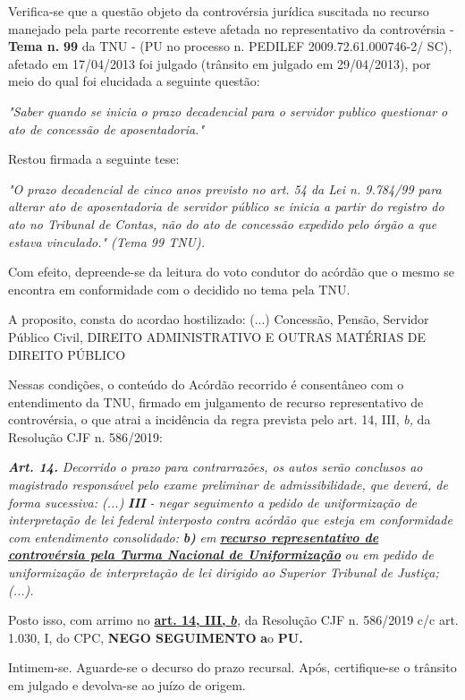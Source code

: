\documentclass[12pt]{article}
\begin{document}
\justifying
\noindent Verifica-se que a questão objeto da controvérsia jurídica suscitada no recurso manejado pela parte recorrente esteve afetada no representativo da controvérsia - \textbf{Tema n. }\textbf{99} da TNU - (PU no processo n. PEDILEF 2009.72.61.000746-2/ SC),  afetado em 17/04/2013 foi julgado (trânsito em julgado em 29/04/2013), por meio do qual foi elucidada a seguinte questão:

\noindent \textit{"Saber quando se inicia o prazo decadencial para o servidor publico questionar o ato de concessão de aposentadoria."}

\noindent Restou firmada a seguinte tese:

\noindent \textit{"O prazo decadencial de cinco anos previsto no art. 54 da Lei n. 9.784/99 para alterar ato de aposentadoria de servidor público se inicia a partir do registro do ato no Tribunal de Contas, não do ato de concessão expedido pelo órgão a que estava vinculado." (Tema 99 TNU).}

\noindent Com efeito, depreende-se da leitura do voto condutor do acórdão que o mesmo se encontra em conformidade com o decidido no  tema pela TNU.

\noindent A proposito, consta do acordao hostilizado: (...) Concessão, Pensão, Servidor Público Civil, DIREITO ADMINISTRATIVO E OUTRAS MATÉRIAS DE DIREITO PÚBLICO

\noindent Nessas condições, o conteúdo do Acórdão recorrido é consentâneo com o entendimento da TNU, firmado em julgamento de recurso representativo de controvérsia, o que atrai a incidência da regra prevista pelo art. 14, III, \textit{b,} da Resolução CJF n. 586/2019:

\noindent \textit{\textbf{Art. 14.}}\textit{ Decorrido o prazo para contrarrazões, os autos serão conclusos ao magistrado responsável pelo exame preliminar de admissibilidade, que deverá, de forma sucessiva: (...) }\textit{\textbf{III }}\textit{- negar seguimento a pedido de uniformização de interpretação de lei federal interposto contra acórdão que esteja em conformidade com entendimento consolidado: }\textit{\textbf{b)}}\textit{ em }\uline{\textit{\textbf{recurso representativo de controvérsia pela Turma Nacional de Uniformização}}}\textit{ ou em pedido de uniformização de interpretação de lei dirigido ao Superior Tribunal de Justiça;(...).}

\noindent Posto isso, com arrimo no \uline{\textbf{art. 14, III, }}\uline{\textit{\textbf{b}}}\textit{,} da Resolução CJF n. 586/2019 c/c art. 1.030, I, do CPC, \textbf{NEGO SEGUIMENTO }\textbf{a}o\textbf{ PU}\textbf{.}

\noindent Intimem-se. Aguarde-se o decurso do prazo recursal. Após, certifique-se o trânsito em julgado e devolva-se ao juízo de origem.
\end{document}

